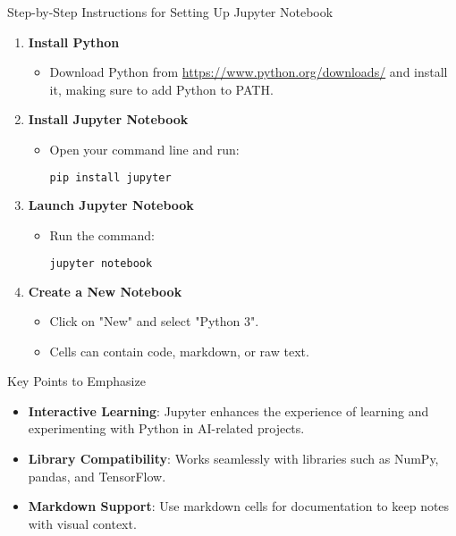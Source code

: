 \documentclass[aspectratio=169]{beamer}
\begin{document}
\begin{frame}{Step-by-Step Instructions for Setting Up Jupyter Notebook}
    \begin{enumerate}
        \item \textbf{Install Python}
        \begin{itemize}
            \item Download Python from \url{https://www.python.org/downloads/} and install it, making sure to add Python to PATH.
        \end{itemize}
        
        \item \textbf{Install Jupyter Notebook}
        \begin{itemize}
            \item Open your command line and run: 
            \begin{lstlisting}[language=bash]
pip install jupyter
            \end{lstlisting}
        \end{itemize}
        
        \item \textbf{Launch Jupyter Notebook}
        \begin{itemize}
            \item Run the command: 
            \begin{lstlisting}[language=bash]
jupyter notebook
            \end{lstlisting}
        \end{itemize}
        
        \item \textbf{Create a New Notebook}
        \begin{itemize}
            \item Click on "New" and select "Python 3". 
            \item Cells can contain code, markdown, or raw text.
        \end{itemize}
    \end{enumerate}
\end{frame}

\begin{frame}{Key Points to Emphasize}
    \begin{itemize}
        \item \textbf{Interactive Learning}: Jupyter enhances the experience of learning and experimenting with Python in AI-related projects.
        \item \textbf{Library Compatibility}: Works seamlessly with libraries such as NumPy, pandas, and TensorFlow.
        \item \textbf{Markdown Support}: Use markdown cells for documentation to keep notes with visual context.
    \end{itemize}
\end{frame}
\end{document}
